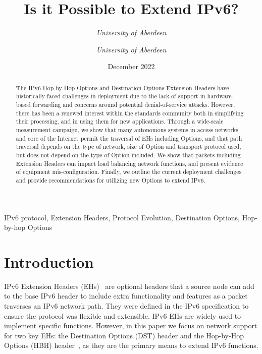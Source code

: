 \documentclass[conference]{IEEEtran}
\title{Is it Possible to Extend IPv6?}
\date{December 2022}
\author{\IEEEauthorblockN{Ana Custura}
\IEEEauthorblockA{
\textit{University of Aberdeen}\\
}
\and
\IEEEauthorblockN{Raffaello Secchi}
\textit{University of Aberdeen}\\
\and
\IEEEauthorblockN{Gorry Fairhurst}
\textit{University of Aberdeen}\\
}
\begin{document}
\maketitle

\begin{abstract}
The IPv6 Hop-by-Hop Options and Destination Options Extension Headers have historically faced challenges in deployment due to the lack of support in hardware-based forwarding and concerns around potential denial-of-service attacks. However, there has been a renewed interest within the standards community both in simplifying their processing, and in using them for new applications. 
Through a wide-scale measurement campaign, we show that many autonomous systems in access networks and core of the Internet permit the traversal of EHs including Options, and that path traversal depends on the type of network, size of Option and transport protocol used, but does not depend on the type of Option included. We show that packets including Extension Headers can impact load balancing network functions, and present evidence of equipment mis-configuration. Finally, we outline the current deployment challenges  and provide recommendations for utilizing new Options to extend IPv6.

\end{abstract}

\begin{IEEEkeywords}
IPv6 protocol, Extension Headers, Protocol Evolution, Destination Options, Hop-by-hop Options
\end{IEEEkeywords}

\section{Introduction}
\label{sec:introduction}

IPv6 Extension Headers (EHs)~\cite{RFC8200} are optional headers that a source node can
add to the base IPv6 header to include extra functionality and features as a packet traverses an IPv6 network path. They were defined in the IPv6 specification
to ensure the protocol was flexible and extensible.
IPv6 EHs are widely used to implement specific functions. 
However, in this paper we focus on network support for two key EHs: the Destination Options (DST) header and the Hop-by-Hop Options (HBH) header~\cite{rfc9098}, as they are the primary means to extend IPv6 functions.
\end{document}
